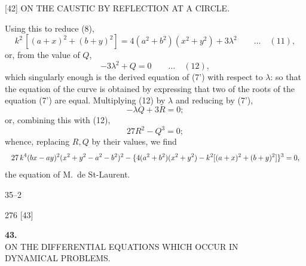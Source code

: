 \documentclass[11pt]{article}
\begin{document}
\vspace{2em}

\begin{center}\small [42] \quad ON THE CAUSTIC BY REFLECTION AT A CIRCLE. \end{center}

\noindent Using this to reduce (8),
\[
  k^{2}\,[(a+x)^{2} + (b+y)^{2}] = 4(a^{2} + b^{2})(x^{2} + y^{2}) + 3\lambda^{2}\qquad\dots\quad (11),
\]
or, from the value of $Q$,
\[
  -3\lambda^{2} + Q = 0\qquad\dots\quad (12),
\]
which singularly enough is the derived equation of (7') with respect to $\lambda$: so that the equation of the curve is obtained by expressing that two of the roots of the equation (7') are equal. Multiplying (12) by $\lambda$ and reducing by (7'),
\[
  -\lambda Q + 3R = 0;
\]
or, combining this with (12),
\[
  27R^{2} - Q^{3} = 0;
\]
whence, replacing $R, Q$ by their values, we find
\[
  \resizebox{\textwidth}{!}{$\displaystyle
  27\,k^{4}(bx - ay)^{2}(x^{2} + y^{2} - a^{2} - b^{2})^{2} - \{4(a^{2} + b^{2})(x^{2} + y^{2}) - k^{2}[(a+x)^{2} + (b+y)^{2}]\}^{3} = 0,
  $}
\]
the equation of M.~de St-Laurent.

\hfill 35--2

\vspace{2em}

\begin{center}\small 276 \hfill [43]\end{center}

\vspace{2em}
\begin{center}
{\Large\bfseries 43.}\\[1em]
{\large ON THE DIFFERENTIAL EQUATIONS WHICH OCCUR IN\\
DYNAMICAL PROBLEMS.}
\end{center}


\bigskip
\end{document}
